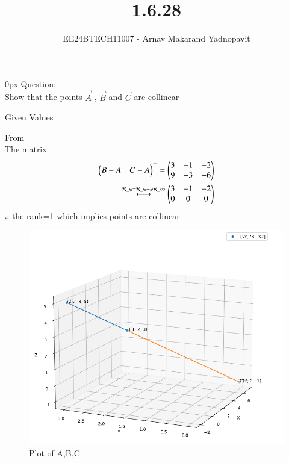 \documentclass[journal]{IEEEtran}
\begin{document}

\title{1.6.28}
\author{EE24BTECH11007 - Arnav Makarand Yadnopavit}
{\let\newpage\relax\maketitle}
\renewcommand{\thefigure}{\theenumi}
\renewcommand{\thetable}{\theenumi}
\setlength{\intextsep}{10pt} %
\renewcommand{\thetable}{\theenumi}
\parindent 0px
Question:\\
Show that the points $\vec{A}$ , $\vec{B}$  and $\vec{C}$  are collinear\\
\solution
\begin{table}[h]
    \centering
    
    \caption{Given Values}
    \label{tab:1}
\end{table}
From \\
The matrix
\begin{align}
\myvec{B-A & C-A}^\top=\myvec{3 & -1 & -2 \\ 9 & -3 & -6}\\
\system{R\_2 =R\_2 -3R\_1} 
\myvec{3 & -1 & -2 \\ 0 & 0 & 0}
\end{align}
$\therefore$ the rank=1 which implies points are collinear.
\begin{figure}[h]
    \centering
    \includegraphics[width=\columnwidth]{figs/fig.png}
    \caption{Plot of A,B,C}
 \end{figure}
\end{document}
